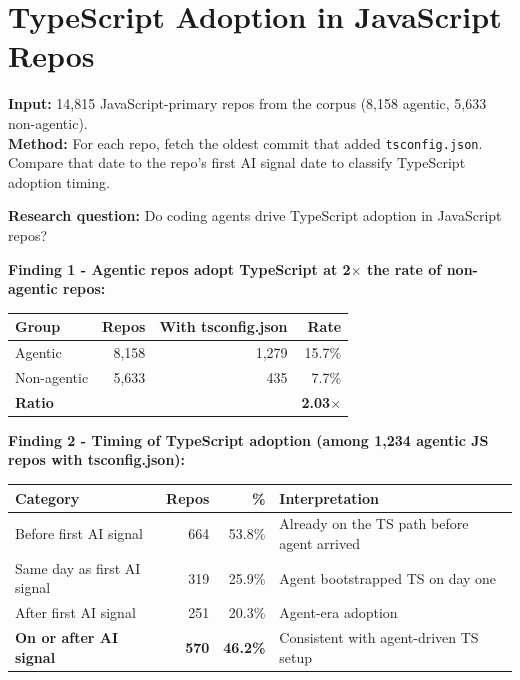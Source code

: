 \documentclass[10pt,a4paper]{article}
\begin{document}
\section{TypeScript Adoption in JavaScript Repos}
\textbf{Input:} 14,815 JavaScript-primary repos from the corpus (8,158 agentic, 5,633 non-agentic).\\
\textbf{Method:} For each repo, fetch the oldest commit that added \texttt{tsconfig.json}.
Compare that date to the repo's first AI signal date to classify TypeScript adoption timing.

\vspace{3pt}
\textbf{Research question:} Do coding agents drive TypeScript adoption in JavaScript repos?

\vspace{4pt}
\textbf{Finding 1 - Agentic repos adopt TypeScript at 2$\times$ the rate of non-agentic repos:}

\vspace{3pt}
\begin{tabular}{@{}lrrr@{}}
\toprule
\textbf{Group} & \textbf{Repos} & \textbf{With tsconfig.json} & \textbf{Rate} \\
\midrule
\rowcolor{rowgray}
Agentic     & 8,158 & 1,279 & 15.7\% \\
Non-agentic & 5,633 &   435 &  7.7\% \\
\midrule
\textbf{Ratio} & & & \textbf{2.03$\times$} \\
\bottomrule
\end{tabular}

\vspace{4pt}
\textbf{Finding 2 - Timing of TypeScript adoption (among 1,234 agentic JS repos with tsconfig.json):}

\vspace{3pt}
\begin{tabular}{@{}p{5.5cm} rr p{6cm}@{}}
\toprule
\textbf{Category} & \textbf{Repos} & \textbf{\%} & \textbf{Interpretation} \\
\midrule
\rowcolor{rowgray}
Before first AI signal      & 664 & 53.8\% & Already on the TS path before agent arrived \\
Same day as first AI signal & 319 & 25.9\% & Agent bootstrapped TS on day one \\
\rowcolor{rowgray}
After first AI signal       & 251 & 20.3\% & Agent-era adoption \\
\midrule
\textbf{On or after AI signal} & \textbf{570} & \textbf{46.2\%} & Consistent with agent-driven TS setup \\
\bottomrule
\end{tabular}
\end{document}
